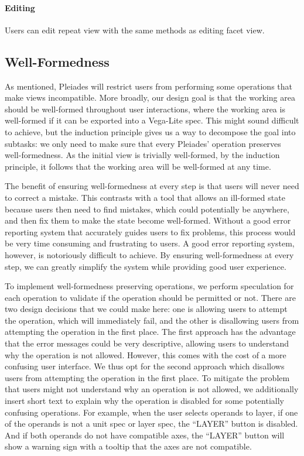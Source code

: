\documentclass[journal]{vgtc}                %
\begin{document}
\paragraph{Editing} Users can edit repeat view with the same methods as editing facet view.

\subsection{Well-Formedness}
As mentioned, Pleiades will restrict users from performing some operations that
make views incompatible. More broadly, our design goal is that the working area
should be well-formed throughout user interactions, where the working area is
well-formed if it can be exported into a Vega-Lite spec. This might sound difficult
to achieve, but the induction principle gives us a way to decompose the goal into
subtasks: we only need to make sure that every Pleiades’ operation preserves
well-formedness. As the initial view is trivially well-formed, by the induction
principle, it follows that the working area will be well-formed at any time.

The benefit of ensuring well-formedness at every step is that users will never
need to correct a mistake. This contrasts with a tool that allows an ill-formed
state because users then need to find mistakes, which could potentially be anywhere,
and then fix them to make the state become well-formed. Without a good error reporting
system that accurately guides users to fix problems, this process would be very time
consuming and frustrating to users. A good error reporting system, however, is
notoriously difficult to achieve. By ensuring well-formedness at every step, we
can greatly simplify the system while providing good user experience.

To implement well-formedness preserving operations, we perform speculation for
each operation to validate if the operation should be permitted or not. There
are two design decisions that we could make here: one is allowing users to attempt
the operation, which will immediately fail, and the other is disallowing users
from attempting the operation in the first place. The first approach has the advantage
that the error messages could be very descriptive, allowing users to understand
why the operation is not allowed. However, this comes with the cost of a more
confusing user interface. We thus opt for the second approach which disallows
users from attempting the operation in the first place. To mitigate the problem
that users might not understand why an operation is not allowed, we additionally
insert short text to explain why the operation is disabled for some potentially
confusing operations. For example, when the user selects operands to layer, if
one of the operands is not a unit spec or layer spec, the “LAYER” button is
disabled. And if both operands do not have compatible axes, the “LAYER” button
will show a warning sign with a tooltip that the axes are not compatible.
\end{document}
